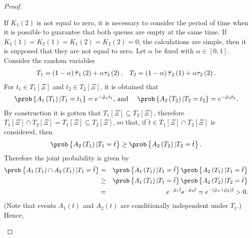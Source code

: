 \begin{proof}
\begin{itemize}
If $K_{1}\left(2\right)$ is not equal to zero, it is necessary to consider the period of time when it is possible to guarantee that both queues are empty at the same time. If $K_{1}\left(1\right)=K_{2}\left(1\right)=K_{1}\left(2\right)=K_{2}\left(2\right)=0$,  the calculations are simple, then it is supposed that they are not equal to zero. 
Let $\alpha$ be fixed with $\alpha\in\left[0,1\right]$. Consider the random variables
\begin{eqnarray}\medskip
\begin{array}{ll}
T_{1}=\left(1-\alpha\right)\overline{\tau}_{1}\left(2\right)+\alpha\tau_{2}\left(2\right),&
T_{2}=\left(1-\alpha\right)\overline{\tau}_{2}\left(1\right)+\alpha\tau_{2}\left(2\right).
\end{array}
\end{eqnarray}
For $t_{1}\in T_{1}\left[\Xi\right]$ and $t_{2}\in T_{2}\left[\Xi\right]$, it is obtained that
\begin{eqnarray}
\begin{array}{ll}
\prob\left\{A_{1}\left(T_{1}\right)|T_{1}=t_{1}\right\}=e^{-\tilde{\mu}_{1}t_{1}}\textrm{, and }&
\prob\left\{A_{2}\left(T_{2}\right)|T_{2}=t_{2}\right\}=e^{-\tilde{\mu}_{2}t_{2}}.
\end{array}
\end{eqnarray}
By construction it is gotten that $T_{1}\left[\Xi\right]\subseteq T_{2}\left[\Xi\right]$, therefore  $T_{1}\left[\Xi\right]\cap T_{2}\left[\Xi\right]=T_{1}\left[\Xi\right]\subseteq T_{2}\left[\Xi\right]$, so that, if $\tilde{t}\in T_{1}\left[\Xi\right]\cap T_{2}\left[\Xi\right]$ is considered, then $$\prob\left\{A_{2}\left(T_{1}\right)|T_{1}=\tilde{t}\right\}\geq\prob\left\{A_{2}\left(T_{2}\right)|T_{2}=\tilde{t}\right\}.$$ Therefore the joint probability is given by
\begin{eqnarray*}\medskip
\prob\left\{A_{1}\left(T_{1}\right)\cap A_{2}\left(T_{1}\right)|T_{1}=\tilde{t}\right\}&=&\prob\left\{A_{1}\left(T_{1}\right)|T_{1}=\tilde{t}\right\}\prob\left\{A_{2}\left(T_{1}\right)|T_{1}=\tilde{t}\right\}\\\medskip
&\geq&\prob\left\{A_{1}\left(T_{1}\right)|T_{1}=\tilde{t}\right\}\prob\left\{A_{2}\left(T_{2}\right)|T_{2}=\tilde{t}\right\}\\
&=& e^{-\tilde{\mu}_{1}\tilde{t}}e^{-\tilde{\mu}_{2}\tilde{t}}
=e^{-\left(\tilde{\mu}_{1}+\tilde{\mu}_{2}\right)\tilde{t}}>0.
\end{eqnarray*}
(Note that events $A_{1}\left(t\right)$ and $A_{2}\left(t\right)$ are conditionally independent under $T_{1}$.)  Hence,

\end{itemize}
\end{proof}
